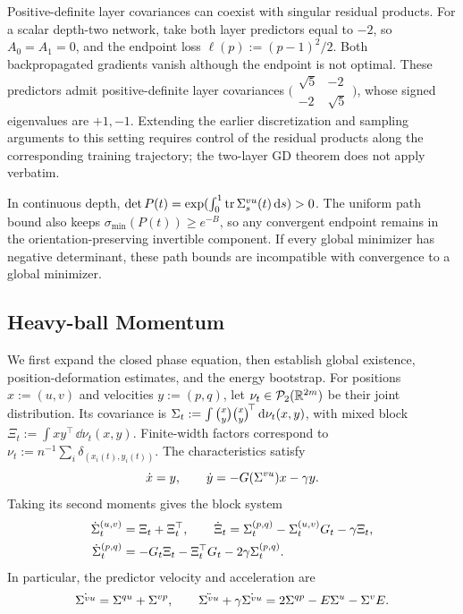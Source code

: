 \begin{remark}
Positive-definite layer covariances can coexist with singular residual
products. For a scalar depth-two network, take both layer predictors equal to $-2$,
so $A_0=A_1=0$, and the endpoint loss $\ell(p):=(p-1)^2/2$.
Both backpropagated gradients vanish although the endpoint is not optimal.
These predictors admit positive-definite layer covariances
$\bigl(\begin{smallmatrix}\sqrt5&-2\\-2&\sqrt5\end{smallmatrix}\bigr)$,
whose signed eigenvalues are $+1,-1$. Extending the earlier discretization and sampling arguments to this setting
requires control of the residual products along the corresponding training
trajectory; the two-layer GD theorem does not apply verbatim.

In continuous depth, $\det P(t)=
\exp(\int_0^1\operatorname{tr}\Sigma^{vu}_s(t)\,\mathrm{d} s)>0$.
The uniform path bound also keeps $\sigma_{\min}(P(t))\ge e^{-B}$,
so any convergent endpoint remains in the orientation-preserving
invertible component. If every global minimizer has negative determinant,
these path bounds are incompatible with convergence to a global minimizer.
\end{remark}

\subsection{Heavy-ball Momentum}\label{app:momentum-proof}
We first expand the closed phase equation, then establish global
existence, position-deformation estimates, and the energy bootstrap.
For positions $x:=(u,v)$ and velocities $y:=(p,q)$, let
$\nu_t\in\mathcal P_2(\mathbb{R}^{2m})$ be their joint distribution. Its covariance is
$\Sigma_t:=\int\binom xy\binom xy^{\!\top}\,\mathrm{d}\nu_t(x,y)$,
with mixed block $\Xi_t:=\int xy^\top\,\dd\nu_t(x,y)$.
Finite-width factors correspond to
$\nu_t:=n^{-1}\sum_i\delta_{(x_i(t),y_i(t))}$.
The characteristics satisfy
\begin{equation}
\label{eq:single-particle-momentum-main}
\dot x=y,\qquad
\dot y=-G(\Sigma^{vu})x-\gamma y.
\end{equation}
Taking its second moments gives the block system
\begin{equation}
\label{eq:phase-block-ode}
\begin{aligned}
\dot{\Sigma}^{(u,v)}_t&=\Xi_t+\Xi_t^\top,\qquad
\dot\Xi_t=\Sigma^{(p,q)}_t-\Sigma^{(u,v)}_tG_t-\gamma\Xi_t,\\
\dot{\Sigma}^{(p,q)}_t&=-G_t\Xi_t-\Xi_t^\top G_t-2\gamma\Sigma^{(p,q)}_t.
\end{aligned}
\end{equation}
In particular, the predictor velocity and acceleration are
\begin{equation}\label{eq:predictor-speed}
 \dot{\Sigma^{vu}}=\Sigma^{qu}+\Sigma^{vp},\qquad
 \ddot{\Sigma^{vu}}+\gamma\dot{\Sigma^{vu}}=2\Sigma^{qp}-E\Sigma^u-\Sigma^v E.
\end{equation}

